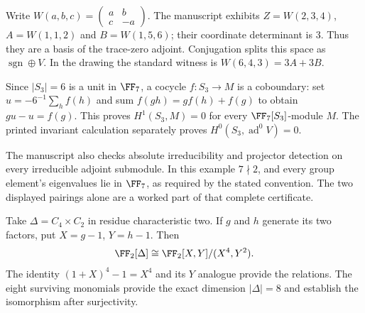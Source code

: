 
Write $W(a,b,c)=\left(\begin{smallmatrix}a&b\\c&-a\end{smallmatrix}\right)$. The manuscript exhibits $Z=W(2,3,4)$, $A=W(1,1,2)$ and $B=W(1,5,6)$; their coordinate determinant is $3$. Thus they are a basis of the trace-zero adjoint. Conjugation splits this space as $\operatorname{sgn}\oplus V$. In the drawing the standard witness is $W(6,4,3)=3A+3B$.

Since $|S_3|=6$ is a unit in $\FF_7$, a cocycle $f:S_3\to M$ is a coboundary: set $u=-6^{-1}\sum_h f(h)$ and sum $f(gh)=g f(h)+f(g)$ to obtain $gu-u=f(g)$. This proves $H^1(S_3,M)=0$ for every $\FF_7[S_3]$-module $M$. The printed invariant calculation separately proves $H^0(S_3,\operatorname{ad}^0V)=0$.

The manuscript also checks absolute irreducibility and projector detection on every irreducible adjoint submodule. In this example $7\nmid2$, and every group element's eigenvalues lie in $\FF_7$, as required by the stated convention. The two displayed pairings alone are a worked part of that complete certificate.


Take $\Delta=C_4\times C_2$ in residue characteristic two. If $g$ and $h$ generate its two factors, put $X=g-1$, $Y=h-1$. Then
\[
\FF_2[\Delta]\cong\FF_2[X,Y]/(X^4,Y^2).
\]
The identity $(1+X)^4-1=X^4$ and its $Y$ analogue provide the relations. The eight surviving monomials provide the exact dimension $|\Delta|=8$ and establish the isomorphism after surjectivity.


